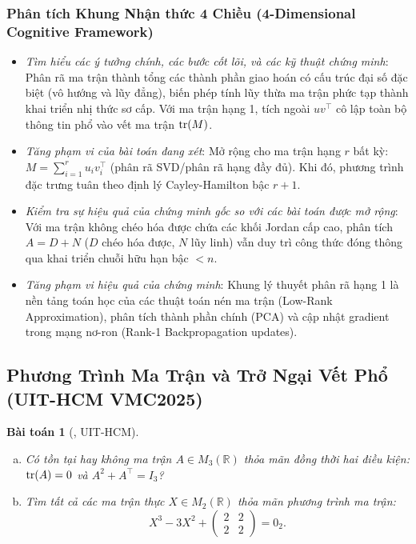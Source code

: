\documentclass{article}
\newtheorem{baitoan}{Bài toán}
\begin{document}


\subsubsection*{Phân tích Khung Nhận thức 4 Chiều (4-Dimensional Cognitive Framework)}
\begin{itemize}
	\item \textit{Tìm hiểu các ý tưởng chính, các bước cốt lõi, và các kỹ thuật chứng minh}: Phân rã ma trận thành tổng các thành phần giao hoán có cấu trúc đại số đặc biệt (vô hướng và lũy đẳng), biến phép tính lũy thừa ma trận phức tạp thành khai triển nhị thức sơ cấp. Với ma trận hạng 1, tích ngoài $u v^\top$ cô lập toàn bộ thông tin phổ vào vết ma trận ${\rm tr}(M)$.
	\item \textit{Tăng phạm vi của bài toán đang xét}: Mở rộng cho ma trận hạng $r$ bất kỳ: $M = \sum_{i=1}^r u_i v_i^\top$ (phân rã SVD/phân rã hạng đầy đủ). Khi đó, phương trình đặc trưng tuân theo định lý Cayley-Hamilton bậc $r+1$.
	\item \textit{Kiểm tra sự hiệu quả của chứng minh gốc so với các bài toán được mở rộng}: Với ma trận không chéo hóa được chứa các khối Jordan cấp cao, phân tích $A = D + N$ ($D$ chéo hóa được, $N$ lũy linh) vẫn duy trì công thức đóng thông qua khai triển chuỗi hữu hạn bậc $< n$.
	\item \textit{Tăng phạm vi hiệu quả của chứng minh}: Khung lý thuyết phân rã hạng 1 là nền tảng toán học của các thuật toán nén ma trận (Low-Rank Approximation), phân tích thành phần chính (PCA) và cập nhật gradient trong mạng nơ-ron (Rank-1 Backpropagation updates).
\end{itemize}


\subsection{Phương Trình Ma Trận và Trở Ngại Vết Phổ (UIT-HCM VMC2025)}

\begin{baitoan}[\cite{VMS_VMC2025}, UIT-HCM]
	\begin{enumerate}[(a)]
		\item Có tồn tại hay không ma trận $A \in M_3(\mathbb{R})$ thỏa mãn đồng thời hai điều kiện: ${\rm tr}(A) = 0$ và $A^2 + A^\top = I_3$?
		\item Tìm tất cả các ma trận thực $X \in M_2(\mathbb{R})$ thỏa mãn phương trình ma trận:
		\begin{equation*}
			X^3 - 3X^2 + \begin{pmatrix} 2 & 2 \\ 2 & 2 \end{pmatrix} = 0_2.
		\end{equation*}
	\end{enumerate}
\end{baitoan}
\end{document}
